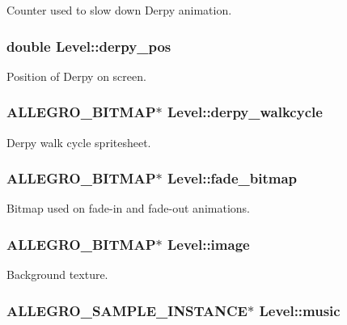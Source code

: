 \-Counter used to slow down \-Derpy animation. \hypertarget{structLevel_a2bc3affc5c71ac8f6b9b775cefac0444}{
\subsubsection[{derpy\-\_\-pos}]{\setlength{\rightskip}{0pt plus 5cm}double {\bf \-Level\-::derpy\-\_\-pos}}}\label{structLevel_a2bc3affc5c71ac8f6b9b775cefac0444}
\-Position of \-Derpy on screen. \hypertarget{structLevel_ab6a78c50cda8424f722ca249f5466f67}{
\subsubsection[{derpy\-\_\-walkcycle}]{\setlength{\rightskip}{0pt plus 5cm}\-A\-L\-L\-E\-G\-R\-O\-\_\-\-B\-I\-T\-M\-A\-P$\ast$ {\bf \-Level\-::derpy\-\_\-walkcycle}}}\label{structLevel_ab6a78c50cda8424f722ca249f5466f67}
\-Derpy walk cycle spritesheet. \hypertarget{structLevel_a1a9629222f6536790772ad7af5d2413c}{
\subsubsection[{fade\-\_\-bitmap}]{\setlength{\rightskip}{0pt plus 5cm}\-A\-L\-L\-E\-G\-R\-O\-\_\-\-B\-I\-T\-M\-A\-P$\ast$ {\bf \-Level\-::fade\-\_\-bitmap}}}\label{structLevel_a1a9629222f6536790772ad7af5d2413c}
\-Bitmap used on fade-\/in and fade-\/out animations. \hypertarget{structLevel_a29a3fe4b6d80ae62843840aa6afa0596}{
\subsubsection[{image}]{\setlength{\rightskip}{0pt plus 5cm}\-A\-L\-L\-E\-G\-R\-O\-\_\-\-B\-I\-T\-M\-A\-P$\ast$ {\bf \-Level\-::image}}}\label{structLevel_a29a3fe4b6d80ae62843840aa6afa0596}
\-Background texture. \hypertarget{structLevel_a41c6aae8f508e078b02c291e1d6f8e67}{
\subsubsection[{music}]{\setlength{\rightskip}{0pt plus 5cm}\-A\-L\-L\-E\-G\-R\-O\-\_\-\-S\-A\-M\-P\-L\-E\-\_\-\-I\-N\-S\-T\-A\-N\-C\-E$\ast$ {\bf \-Level\-::music}}}\label{structLevel_a41c6aae8f508e078b02c291e1d6f8e67}

